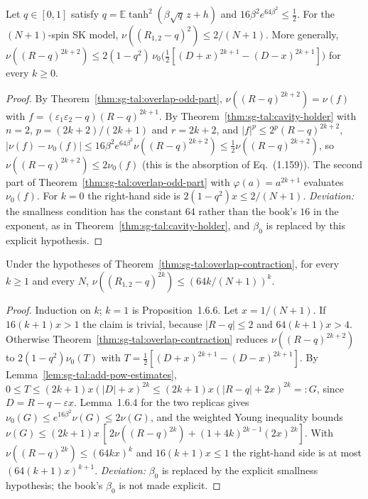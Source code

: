 \begin{theorem}
\label{thm:sg-tal:overlap-contraction}
  \leanok
{}
Let $q\in[0,1]$ satisfy $q=\mathbb E\tanh^2(\beta\sqrt q\,z+h)$ and $16\beta^2e^{64\beta^2}\le\frac12$. For the
$(N+1)$-spin SK model, $\nu((R_{1,2}-q)^2)\le 2/(N+1)$. More generally,
$\nu((R-q)^{2k+2})\le2(1-q^2)\,\nu_0\bigl(\tfrac12[(D+x)^{2k+1}-(D-x)^{2k+1}]\bigr)$ for every $k\ge0$.
\end{theorem}
\begin{proof}
  \leanok
By Theorem~\ref{thm:sg-tal:overlap-odd-part}, $\nu((R-q)^{2k+2})=\nu(f)$ with
$f=(\varepsilon_1\varepsilon_2-q)(R-q)^{2k+1}$. By Theorem~\ref{thm:sg-tal:cavity-holder} with $n=2$, $p=(2k+2)/(2k+1)$ and
$r=2k+2$, and $|f|^p\le2^p(R-q)^{2k+2}$, $|\nu(f)-\nu_0(f)|\le16\beta^2e^{64\beta^2}\nu((R-q)^{2k+2})\le
\frac12\nu((R-q)^{2k+2})$, so $\nu((R-q)^{2k+2})\le2\nu_0(f)$ (this is the absorption of Eq.~(1.159)). The second part of
Theorem~\ref{thm:sg-tal:overlap-odd-part} with $\varphi(a)=a^{2k+1}$ evaluates $\nu_0(f)$. For $k=0$ the right-hand
side is $2(1-q^2)x\le2/(N+1)$.
\emph{Deviation:} the smallness condition has the constant $64$ rather than the book's $16$ in the exponent, as in
Theorem~\ref{thm:sg-tal:cavity-holder}, and $\beta_0$ is replaced by this explicit hypothesis.
\end{proof}

\begin{theorem}
\label{thm:sg-tal:overlap-moments}
  \leanok
{}
Under the hypotheses of Theorem~\ref{thm:sg-tal:overlap-contraction}, for every $k\ge1$ and every $N$,
$\nu((R_{1,2}-q)^{2k})\le(64k/(N+1))^k$.
\end{theorem}
\begin{proof}
  \leanok
Induction on $k$; $k=1$ is Proposition~1.6.6. Let $x=1/(N+1)$. If $16(k+1)x>1$ the claim is trivial, because
$|R-q|\le2$ and $64(k+1)x>4$. Otherwise Theorem~\ref{thm:sg-tal:overlap-contraction} reduces
$\nu((R-q)^{2k+2})$ to $2(1-q^2)\nu_0(T)$ with $T=\frac12[(D+x)^{2k+1}-(D-x)^{2k+1}]$. By Lemma~\ref{lem:sg-tal:add-pow-estimates},
$0\le T\le(2k+1)x(|D|+x)^{2k}\le(2k+1)x(|R-q|+2x)^{2k}=:G$, since $D=R-q-\varepsilon x$. Lemma~1.6.4 for the two
replicas gives $\nu_0(G)\le e^{16\beta^2}\nu(G)\le2\nu(G)$, and the weighted Young inequality bounds
$\nu(G)\le(2k+1)x\,[\,2\nu((R-q)^{2k})+(1+4k)^{2k-1}(2x)^{2k}]$. With $\nu((R-q)^{2k})\le(64kx)^k$ and $16(k+1)x\le1$ the
right-hand side is at most $(64(k+1)x)^{k+1}$.
\emph{Deviation:} $\beta_0$ is replaced by the explicit smallness hypothesis; the book's
$\beta_0$ is not made explicit.
\end{proof}

